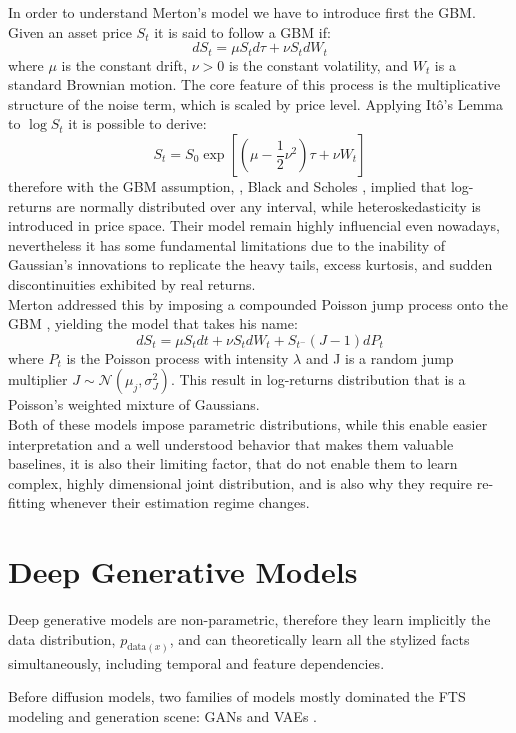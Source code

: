 In order to understand Merton's model we have to introduce first the GBM. Given an asset price \(S_t\) it is said to follow a GBM if:
\begin{equation}
    \label{eq:blackscholes}
    dS_t=\mu S_td\tau+\nu S_tdW_t
\end{equation}
where \(\mu\) is the constant drift, \(\nu>0\) is the constant volatility, and \(W_t\) is a standard Brownian motion. The core feature of this process is the multiplicative structure of the noise term, which is scaled by price level. Applying Itô's Lemma to \(\log S_t\) it is possible to derive:
$$S_t=S_0\exp{\left[\left(\mu-\frac12\nu^2\right)\tau+\nu W_t\right]}$$
therefore with the GBM assumption, , Black and Scholes \cite{black1973pricing}, implied that log-returns are normally distributed over any interval, while heteroskedasticity is introduced in price space. Their model remain highly influencial even nowadays, nevertheless it has some fundamental limitations due to the inability of Gaussian's innovations to replicate the heavy tails, excess kurtosis, and sudden discontinuities exhibited by real returns.\\

Merton addressed this by imposing a compounded Poisson jump process onto the GBM \cite{merton1976option}, yielding the model that takes his name:
$$dS_t=\mu S_tdt+\nu S_tdW_t+S_{t^-}(J-1)dP_t$$
where \(P_t\) is the Poisson process with intensity \(\lambda\) and J is a random jump multiplier \(J\sim \mathcal{N}(\mu_j, \sigma_J^2)\). This result in log-returns distribution that is a Poisson's weighted mixture of Gaussians.\\

Both of these models impose parametric distributions, while this enable easier interpretation and a well understood behavior that makes them valuable baselines, it is also their limiting factor, that do not enable them to learn complex, highly dimensional joint distribution, and is also why they require re-fitting whenever their estimation regime changes.

\section{Deep Generative Models}
Deep generative models are non-parametric, therefore they learn implicitly the data distribution, \(p_{\text{data}(x)}\), and can theoretically learn all the stylized facts simultaneously, including temporal and feature dependencies.

Before diffusion models, two families of models mostly dominated the FTS modeling and generation scene: GANs \cite{goodfellow2014generative, creswell2018generative,yoon2019time,vuletic2024fingan} and VAEs \cite{kingma2014auto, kingma2019introduction}.\\

